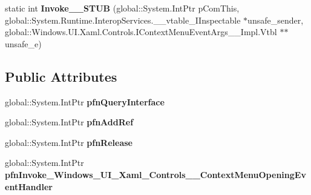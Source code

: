\begin{DoxyCompactItemize}
\item 
\mbox{\label{struct_windows_1_1_u_i_1_1_xaml_1_1_controls_1_1_context_menu_opening_event_handler_____impl_1_1_vtbl_a5993dd6406aa5ec378bcd75a82cffe2c}} 
static int {\bfseries Invoke\+\_\+\+\_\+\+S\+T\+UB} (global\+::\+System.\+Int\+Ptr p\+Com\+This, global\+::\+System.\+Runtime.\+Interop\+Services.\+\_\+\+\_\+vtable\+\_\+\+I\+Inspectable $\ast$unsafe\+\_\+sender, global\+::\+Windows.\+U\+I.\+Xaml.\+Controls.\+I\+Context\+Menu\+Event\+Args\+\_\+\+\_\+\+Impl.\+Vtbl $\ast$$\ast$unsafe\+\_\+e)
\end{DoxyCompactItemize}
\subsection*{Public Attributes}
\begin{DoxyCompactItemize}
\item 
\mbox{\label{struct_windows_1_1_u_i_1_1_xaml_1_1_controls_1_1_context_menu_opening_event_handler_____impl_1_1_vtbl_a60a73b714481bedc6af729fa1f2dc706}} 
global\+::\+System.\+Int\+Ptr {\bfseries pfn\+Query\+Interface}
\item 
\mbox{\label{struct_windows_1_1_u_i_1_1_xaml_1_1_controls_1_1_context_menu_opening_event_handler_____impl_1_1_vtbl_a03e6a91bf3c21d3cb16adfe24afb54d1}} 
global\+::\+System.\+Int\+Ptr {\bfseries pfn\+Add\+Ref}
\item 
\mbox{\label{struct_windows_1_1_u_i_1_1_xaml_1_1_controls_1_1_context_menu_opening_event_handler_____impl_1_1_vtbl_afe8bab88684e38d6123da1937ea31d0d}} 
global\+::\+System.\+Int\+Ptr {\bfseries pfn\+Release}
\item 
\mbox{\label{struct_windows_1_1_u_i_1_1_xaml_1_1_controls_1_1_context_menu_opening_event_handler_____impl_1_1_vtbl_adfb64b803f064d13a0a85042740a580f}} 
global\+::\+System.\+Int\+Ptr {\bfseries pfn\+Invoke\+\_\+\+Windows\+\_\+\+U\+I\+\_\+\+Xaml\+\_\+\+Controls\+\_\+\+\_\+\+Context\+Menu\+Opening\+Event\+Handler}
\end{DoxyCompactItemize}

